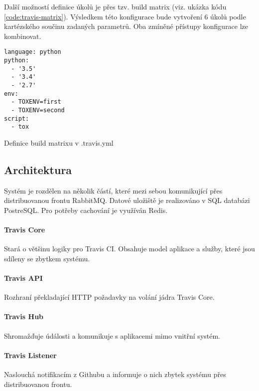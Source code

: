 Další možností definice úkolů je přes tzv. build matrix (viz. ukázka kódu \ref{code:travis-matrix}).
Výsledkem této konfigurace bude vytvoření 6 úkolů podle kartézského součinu zadaných parametrů.
Oba zmíněné přístupy konfigurace lze kombinovat.

\begin{listing}[ht]
\begin{verbatim}
language: python
python:
  - '3.5'
  - '3.4'
  - '2.7'
env:
  - TOXENV=first
  - TOXENV=second
script:
  - tox
\end{verbatim}
\caption{\label{code:travis-matrix}Definice build matrixu v .travis.yml}
\end{listing}

\subsection{Architektura}

Systém je rozdělen na několik částí, které mezi sebou komunikující přes distribuovanou frontu RabbitMQ.
Datové uložiště je realizováno v SQL databázi PostreSQL.
Pro potřeby cachování je využíván Redis.


\paragraph{Travis Core}

Stará o většinu logiky pro Travis CI.
Obsahuje model aplikace a služby, které jsou sdíleny se zbytkem systému.

\paragraph{Travis API}

Rozhraní překladající HTTP požadavky na volání jádra Travis Core.

\paragraph{Travis Hub}

Shromažďuje údálosti a komunikuje s aplikacemi mimo vnitřní systém.

\paragraph{Travis Listener}

Naslouchá notifikacím z Githubu a informuje o nich zbytek systému přes distribuovanou frontu.

